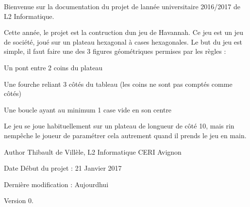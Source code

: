 Bienvenue sur la documentation du projet de l\textquotesingle{}année universitaire 2016/2017 de L2 Informatique.

Cette année, le projet est la contruction d\textquotesingle{}un jeu de Havannah. Ce jeu est un jeu de société, joué sur un plateau hexagonal à cases hexagonales. Le but du jeu est simple, il faut faire une des 3 figures géométriques permises par les règles \+:
\begin{DoxyEnumerate}
\item Un pont entre 2 coins du plateau
\item Une fourche reliant 3 côtés du tableau (les coins ne sont pas comptés comme côtés)
\item Une boucle ayant au minimum 1 case vide en son centre
\end{DoxyEnumerate}

Le jeu se joue habituellement sur un plateau de longueur de côté 10, mais rin n\textquotesingle{}empêche le joueur de paramétrer cela autrement quand il prends le jeu en main. \begin{DoxyAuthor}{Author}
Thibault de Villèle, L2 Informatique C\+E\+RI Avignon 
\end{DoxyAuthor}
\begin{DoxyDate}{Date}
Début du projet \+: 21 Janvier 2017 

Dernière modification \+: Aujourd\textquotesingle{}hui 
\end{DoxyDate}
\begin{DoxyVersion}{Version}
0. 
\end{DoxyVersion}
